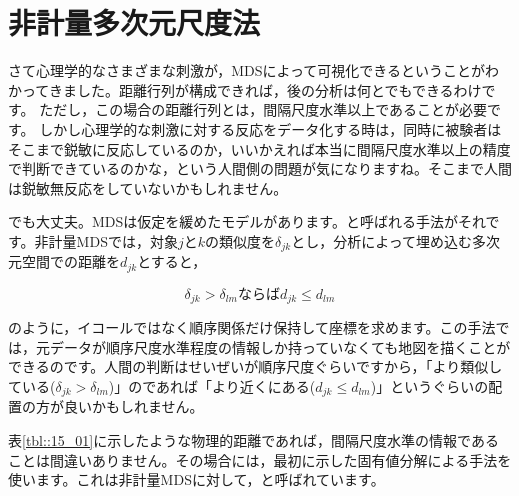 \documentclass{ltjsbook}
\begin{document}
\section{非計量多次元尺度法}

さて心理学的なさまざまな刺激が，MDSによって可視化できるということがわかってきました。距離行列が構成できれば，後の分析は何とでもできるわけです。
ただし，この場合の距離行列とは，間隔尺度水準以上であることが必要です。
しかし心理学的な刺激に対する反応をデータ化する時は，同時に被験者はそこまで鋭敏に反応しているのか，いいかえれば本当に間隔尺度水準以上の精度で判断できているのかな，という人間側の問題が気になりますね。そこまで人間は鋭敏無反応をしていないかもしれません。

でも大丈夫。MDSは仮定を緩めたモデルがあります。と呼ばれる手法がそれです。非計量MDSでは，対象$j$と$k$の類似度を$\delta_{jk}$とし，分析によって埋め込む多次元空間での距離を$d_{jk}$とすると，

$$ \delta_{jk} > \delta_{lm} \mbox{ならば}d_{jk}\le d_{lm} $$

のように，イコールではなく順序関係だけ保持して座標を求めます。この手法では，元データが順序尺度水準程度の情報しか持っていなくても地図を描くことができるのです。人間の判断はせいぜいが順序尺度ぐらいですから，「より類似している($\delta_{jk} > \delta_{lm}$)」のであれば「より近くにある($d_{jk}\le d_{lm} $)」というぐらいの配置の方が良いかもしれません。


表\ref{tbl::15_01}に示したような物理的距離であれば，間隔尺度水準の情報であることは間違いありません。その場合には，最初に示した固有値分解による手法を使います。これは非計量MDSに対して，と呼ばれています。
\end{document}

